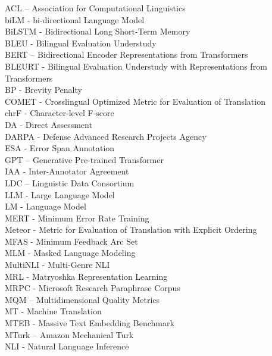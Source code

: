 \documentclass[12pt,a4paper]{report}
\begin{document}
ACL – Association for Computational Linguistics \\
biLM - bi-directional Language Model \\
BiLSTM - Bidirectional Long Short-Term Memory \\
BLEU - Bilingual Evaluation Understudy \\
BERT – Bidirectional Encoder Representations from Transformers \\
BLEURT - Bilingual Evaluation Understudy with Representations from Transformers \\
BP - Brevity Penalty \\
COMET - Crosslingual Optimized Metric for Evaluation of Translation \\
chrF - Character-level F-score \\
DA - Direct Assessment \\
DARPA - Defense Advanced Research Projects Agency \\
ESA - Error Span Annotation \\
GPT – Generative Pre-trained Transformer \\
IAA - Inter-Annotator Agreement \\
LDC – Linguistic Data Consortium \\
LLM - Large Language Model \\
LM - Language Model \\
MERT - Minimum Error Rate Training \\ 
Meteor - Metric for Evaluation of Translation with Explicit Ordering \\
MFAS - Minimum Feedback Arc Set \\
MLM - Masked Language Modeling \\
MultiNLI - Multi-Genre NLI \\
MRL - Matryoshka Representation Learning \\
MRPC - Microsoft Research Paraphrase Corpus \\
MQM – Multidimensional Quality Metrics \\
MT - Machine Translation \\
MTEB - Massive Text Embedding Benchmark \\
MTurk – Amazon Mechanical Turk \\
NLI - Natural Language Inference \\
\end{document}
